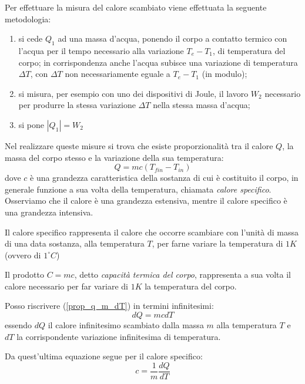 \documentclass[class=book, crop=false, oneside, 12pt]{standalone}
\begin{document}
Per effettuare la misura del calore scambiato viene effettuata la seguente metodologia:
\begin{enumerate}
    \item si cede \(Q_1\) ad una massa d'acqua, ponendo il corpo a contatto termico con l'acqua per il tempo necessario alla variazione \(T_e - T_1\), di temperatura del corpo; 
    in corrispondenza anche l'acqua subisce una variazione di temperatura \(\Delta T\), con \(\Delta T\) non necessariamente eguale a \(T_e - T_1\) (in modulo);
    \item si misura, per esempio con uno dei dispositivi di Joule, il lavoro \(W_2\) necessario per produrre la stessa variazione \(\Delta T\) nella stessa massa d'acqua; 
    \item si pone \(| Q_1 | = W_2\)
\end{enumerate}

Nel realizzare queste misure si trova che esiste proporzionalità tra il calore \(Q\), la massa del corpo stesso e la variazione della sua temperatura:
\begin{equation} \label{prop_q_m_dT}
    Q = m c \left(T_{fin} - T_{in}\right)
\end{equation} 
dove \(c\) è una grandezza caratteristica della sostanza di cui è costituito il corpo, in generale funzione a sua volta della temperatura, chiamata \emph{calore specifico}.
Osserviamo che il calore è una grandezza estensiva, mentre il calore specifico è una grandezza intensiva.

Il calore specifico rappresenta il calore che occorre scambiare con l'unità di massa di una data sostanza, alla temperatura \(T\), per farne variare la temperatura di \(1 K\) (ovvero di \(1 ^{\circ} C\))

Il prodotto \(C = mc\), detto \emph{capacità termica del corpo}, rappresenta a sua volta il calore necessario per far variare di \(1 K\) la temperatura del corpo.

Posso riscrivere (\ref{prop_q_m_dT}) in termini infinitesimi:
\begin{equation}
    d Q = m c d T
\end{equation}
essendo \( d Q \) il calore infinitesimo scambiato dalla massa \(m\) alla temperatura \(T\) e \(d T\) la corrispondente variazione infinitesima di temperatura.

Da quest'ultima equazione segue per il calore specifico:
\begin{equation}
    c = \frac{1}{m} \frac{d Q}{d T}
\end{equation}
\end{document}
